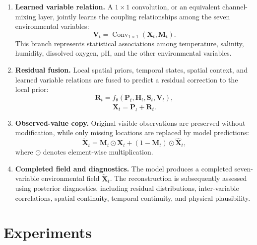 \documentclass[conference]{IEEEtran}
\begin{document}
\begin{enumerate}
    \item \textbf{Learned variable relation.}
    A $1\times1$ convolution, or an equivalent channel-mixing layer, jointly
    learns the coupling relationships among the seven environmental
    variables:
    \begin{equation}
\mathbf{V}_t
    =
    \operatorname{Conv}_{1\times1}
    \left(
    \mathbf{X}_t,\mathbf{M}_t
    \right).
\label{eq:variable-relation}
\end{equation}
    This branch represents statistical associations among temperature,
    salinity, humidity, dissolved oxygen, pH, and the other environmental
    variables.

    \item \textbf{Residual fusion.}
    Local spatial priors, temporal states, spatial context, and learned
    variable relations are fused to predict a residual correction to the
    local prior:
    \begin{equation}
\mathbf{R}_t
    =
    f_{\theta}
    \left(
    \mathbf{P}_t,\mathbf{H}_t,\mathbf{S}_t,\mathbf{V}_t
    \right),
\label{eq:residual}
\end{equation}
    \begin{equation}
\widehat{\mathbf{X}}_t
    =
    \mathbf{P}_t+\mathbf{R}_t.
\label{eq:prediction}
\end{equation}

    \item \textbf{Observed-value copy.}
    Original visible observations are preserved without modification, while
    only missing locations are replaced by model predictions:
    \begin{equation}
\widetilde{\mathbf{X}}_t
    =
    \mathbf{M}_t\odot\mathbf{X}_t
    +
    \left(1-\mathbf{M}_t\right)\odot
    \widehat{\mathbf{X}}_t,
\label{eq:observed-copy}
\end{equation}
    where $\odot$ denotes element-wise multiplication.

    \item \textbf{Completed field and diagnostics.}
    The model produces a completed seven-variable environmental field
    $\widetilde{\mathbf{X}}_t$. The reconstruction is subsequently assessed
    using posterior diagnostics, including residual distributions,
    inter-variable correlations, spatial continuity, temporal continuity,
    and physical plausibility.
\end{enumerate}

\section{Experiments}
\end{document}
